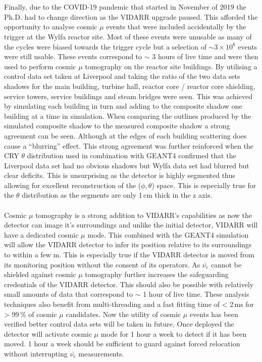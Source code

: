 \\\\Finally, due to the COVID-19 pandemic that started in November of 2019 the Ph.D. had to change direction as the VIDARR upgrade paused. This afforded the opportunity to analyse cosmic $\mu$ events that were included accidentally by the trigger at the Wylfa reactor site. Most of these events were unusable as many of the cycles were biased towards the trigger cycle but a selection of $\sim 3\times 10^6$ events were still usable. These events correspond to $\sim$ 3 hours of live time and were then used to perform cosmic $\mu$ tomography on the reactor site buildings. By utilising a control data set taken at Liverpool and taking the ratio of the two data sets shadows for the main building, turbine hall, reactor core / reactor core shielding, service towers, service buildings and steam bridges were seen. This was achieved by simulating each building in turn and adding to the composite shadow one building at a time in simulation. When comparing the outlines produced by the simulated composite shadow to the measured composite shadow a strong agreement can be seen. Although at the edges of each building scattering does cause a ``blurring'' effect. This strong agreement was further reinforced when the CRY \cite{ieee_cry_2007} $\theta$ distribution used in combination with GEANT4 confirmed that the Liverpool data set had no obvious shadows but Wylfa data set had blurred but clear deficits. This is unsurprising as the detector is highly segmented thus allowing for excellent reconstruction of the ($\phi,\theta$) space. This is especially true for the $\theta$ distribution as the segments are only 1\,cm thick in the z axis.
\\\\Cosmic $\mu$ tomography is a strong addition to VIDARR's capabilities as now the detector can image it's surroundings and unlike the initial detector, VIDARR will have a dedicated cosmic $\mu$ mode. This combined with the GEANT4 simulation will allow the VIDARR detector to infer its position relative to its surroundings to within a few m. This is especially true if the VIDARR detector is moved from its monitoring position without the consent of its operators. As $\bar{\nu_e}$ cannot be shielded against cosmic $\mu$ tomography further increases the safeguarding credentials of the VIDARR detector. This should also be possible with relatively small amounts of data that correspond to $\sim$ 1 hour of live time. These analysis techniques also benefit from multi-threading and a fast fitting time of < 2\,ms for > 99\,\% of cosmic $\mu$ candidates. Now the utility of cosmic $\mu$ events has been verified better control data sets will be taken in future. Once deployed the detector will activate cosmic $\mu$ mode for 1 hour a week to detect if it has been moved. 1 hour a week should be sufficient to guard against forced relocation without interrupting $\bar{\nu_e}$ measurements.
